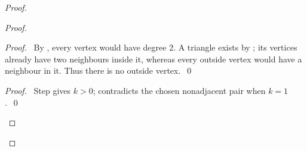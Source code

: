 \begin{proof}
 \begin{proof}
  \begin{proof}
   \pf\ By , every vertex would have degree 2. A triangle exists by
   ; its vertices already have two neighbours inside it, whereas
   every outside vertex would have a neighbour in it. Thus there is no outside vertex.~\qed
  \end{proof}
  \qedstep
  \begin{proof}
   \pf\ Step  gives $k>0$;  contradicts the chosen nonadjacent pair when $k=1$.~\qed
  \end{proof}
 \end{proof}


\end{proof}
